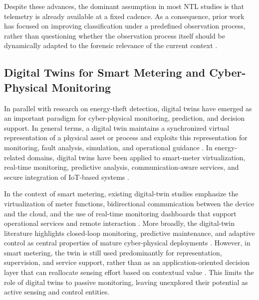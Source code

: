 \documentclass[journal]{IEEEtran}
\begin{document}
Despite these advances, the dominant assumption in most NTL studies is that telemetry is already available at a fixed cadence. As a consequence, prior work has focused on improving classification under a predefined observation process, rather than questioning whether the observation process itself should be dynamically adapted to the forensic relevance of the current context \cite{b2, b5, b6}.


\subsection{Digital Twins for Smart Metering and Cyber-Physical Monitoring}
In parallel with research on energy-theft detection, digital twins have emerged as an important paradigm for cyber-physical monitoring, prediction, and decision support. In general terms, a digital twin maintains a synchronized virtual representation of a physical asset or process and exploits this representation for monitoring, fault analysis, simulation, and operational guidance \cite{b15, b16, b17}. In energy-related domains, digital twins have been applied to smart-meter virtualization, real-time monitoring, predictive analysis, communication-aware services, and secure integration of IoT-based systems \cite{b18, b19, b20, b21, b22}.

In the context of smart metering, existing digital-twin studies emphasize the virtualization of meter functions, bidirectional communication between the device and the cloud, and the use of real-time monitoring dashboards that support operational services and remote interaction \cite{b19, b20, b22}. More broadly, the digital-twin literature highlights closed-loop monitoring, predictive maintenance, and adaptive control as central properties of mature cyber-physical deployments \cite{b23, b24, b25}. However, in smart metering, the twin is still used predominantly for representation, supervision, and service support, rather than as an application-oriented decision layer that can reallocate sensing effort based on contextual value \cite{b18, b20, b22}. This limits the role of digital twins to passive monitoring, leaving unexplored their potential as active sensing and control entities.
\end{document}
